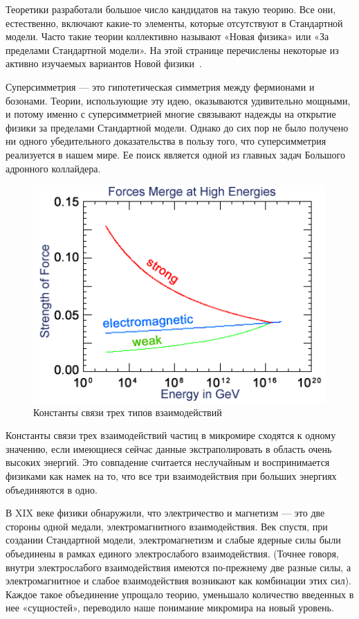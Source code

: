 Теоретики разработали большое число кандидатов на такую теорию. Все они, естественно, включают какие-то элементы, которые отсутствуют в Стандартной модели. Часто такие теории коллективно называют «Новая физика» или «За пределами Стандартной модели». На этой странице перечислены некоторые из активно изучаемых вариантов Новой физики~\cite{2part-1}.

Суперсимметрия — это гипотетическая симметрия между фермионами и бозонами. Теории, использующие эту идею, оказываются удивительно мощными, и потому именно с суперсимметрией многие связывают надежды на открытие физики за пределами Стандартной модели. Однако до сих пор не было получено ни одного убедительного доказательства в пользу того, что суперсимметрия реализуется в нашем мире. Ее поиск является одной из главных задач Большого адронного коллайдера.
\begin{figure}[h]
	\centering
	\includegraphics[width=\textwidth]{figures/hep-sm.png}
	\caption{Константы связи трех типов взаимодействий}
	\label{fig:fig01}
\end{figure}
Константы связи трех взаимодействий частиц в микромире сходятся к одному значению, если имеющиеся сейчас данные экстраполировать в область очень высоких энергий. Это совпадение считается неслучайным и воспринимается физиками как намек на то, что все три взаимодействия при больших энергиях объединяются в одно.

В XIX веке физики обнаружили, что электричество и магнетизм — это две стороны одной медали, электромагнитного взаимодействия. Век спустя, при создании Стандартной модели, электромагнетизм и слабые ядерные силы были объединены в рамках единого электрослабого взаимодействия. (Точнее говоря, внутри электрослабого взаимодействия имеются по-прежнему две разные силы, а электромагнитное и слабое взаимодействия возникают как комбинации этих сил). Каждое такое объединение упрощало теорию, уменьшало количество введенных в нее «сущностей», переводило наше понимание микромира на новый уровень.

